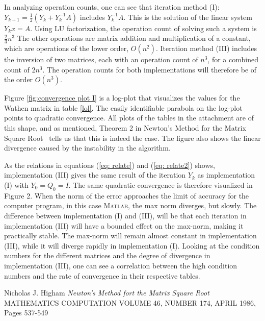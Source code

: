 In analyzing operation counts, one can see that iteration method (I): $Y_{k+1}=\frac{1}{2}(Y_{k}+Y_{k}^{-1}A)$ includes $Y_{k}^{-1}A$. This is the solution of the linear system $Y_{k}x=A$. Using LU factorization, the operation count of solving such a system is $\frac{2}{3}n^{3}$ The other operations are matrix addition and multiplication of a constant, which are operations of the lower order, $O(n^{2})$. Iteration method (III) includes the inversion of two matrices, each with an operation count of $n^{3}$, for a combined count of $2n^{3}$. The operation counts for both implementations will therefore be of the order $O(n^3)$.

Figure \ref{fig:convergence plot I} is a log-plot that visualizes the values for the Wathen matrix in table \ref{lol}. The easily identifiable parabola on the log-plot points to quadratic convergence. All plots of the tables in the attachment are of this shape, and as mentioned, Theorem 2 in Newton's Method for the Matrix Square Root~\cite{paper} tells us that this is indeed the case. The figure also shows the linear divergence caused by the instability in the algorithm. 

As the relations in equations (\ref{eq: relate}) and (\ref{eq: relate2})  shows, implementation (III) gives the same result of the iteration  $Y_k$ as implementation (I) with $Y_{0}=Q_{0}=I$. The same quadratic convergence is therefore visualized in Figure 2. When the norm of the error approaches the limit of accuracy for the computer program, in this case \textsc{Matlab}, the max norm diverges, but slowly. The difference between implementation (I) and (III), will be that each iteration in implementation (III) will have a bounded effect on the max-norm, making it practically stable. The max-norm will remain almost constant in implementation (III), while it will diverge rapidly in implementation (I). Looking at the condition numbers for the different matrices and the degree of divergence in implementation (III), one can see a correlation between the high condition numbers and the rate of convergence in their respective tables.


\begin{thebibliography}{00}
 Nicholas J. Higham \textit{Newton's Method fort the Matrix Square Root} MATHEMATICS COMPUTATION VOLUME 46, NUMBER 174, APRIL 1986, Pages 537-549
\end{thebibliography}

